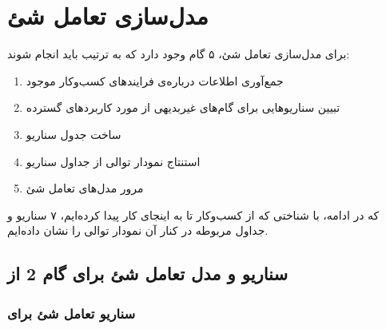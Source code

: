 \chapter{مدل‌سازی تعامل شئ}
برای مدل‌‌سازی تعامل شئ، ۵ گام وجود دارد که به ترتیب باید انجام شوند:
\begin{enumerate}
	\item
	جمع‌آوری اطلاعات درباره‌ی فرایند‌های کسب‌وکار موجود 
	\item 
	تبیین سناریو‌هایی برای گام‌های غیربدیهی از مورد کاربرد‌های گسترده
	\item 
	ساخت جدول سناریو
	\item 
	استنتاج نمودار توالی از جداول سناریو
	\item 
	مرور مدل‌های تعامل شئ
\end{enumerate}
که در ادامه، با شناختی که از کسب‌وکار تا به اینجای کار پیدا کرده‌ایم، ۷ سناریو و جداول مربوطه در کنار آن نمودار توالی را نشان داده‌ایم.

\clearpage
\section{سناریو و مدل تعامل شئ برای گام 2 از }
\subsection{سناریو تعامل شئ برای }

